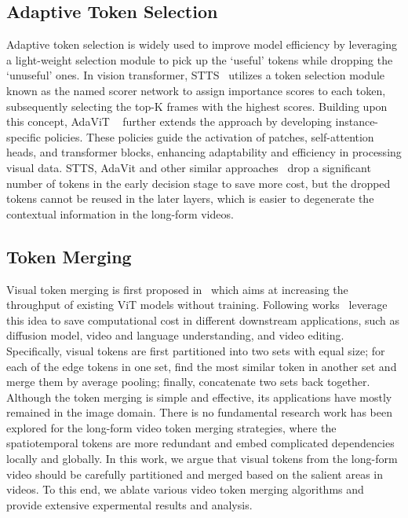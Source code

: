\documentclass{article}
\begin{document}
\subsection{Adaptive Token Selection} 
\vspace*{-0.2cm}
Adaptive token selection is widely used to improve model efficiency by leveraging a light-weight selection module to pick up the `useful' tokens while dropping the `unuseful' ones. In vision transformer, STTS~\citep{wang2021efficient} utilizes a token selection module known as the named scorer network to assign importance scores to each token, subsequently selecting the top-K frames with the highest scores. Building upon this concept, AdaViT ~\citep{meng2022adavit} further extends the approach by developing instance-specific policies. These policies guide the activation of patches, self-attention heads, and transformer blocks, enhancing adaptability and efficiency in processing visual data. STTS, AdaVit and other similar approaches~\citep{wang2021efficient,meng2022adavit,rao2021dynamicvit,liang2022not} drop a significant number of tokens in the early decision stage to save more cost, but the dropped tokens cannot be reused in the later layers, which is easier to degenerate the contextual information in the long-form videos. 

\vspace*{-0.2cm}
\subsection{Token Merging} 
\vspace*{-0.2cm}
Visual token merging is first proposed in~\citep{bolya2022tome} which aims at increasing the throughput of existing ViT models without training. Following works~\citep{ren2023testa, bolya2023tomesd, li2023vidtome} leverage this idea to save computational cost in different downstream applications, such as diffusion model, video and language understanding, and video editing. Specifically, visual tokens are first partitioned into two sets with equal size; for each of the edge tokens in one set, find the most similar token in another set and merge them by average pooling; finally, concatenate two sets back together. Although the token merging is simple and effective, its applications have mostly remained in the image domain. There is no fundamental research work has been explored for the long-form video token merging strategies, where the spatiotemporal tokens are more redundant and embed complicated dependencies locally and globally. In this work, we argue that visual tokens from the long-form video should be carefully partitioned and merged based on the salient areas in videos. To this end, we ablate various video token merging algorithms and provide extensive expermental results and analysis.
\end{document}
